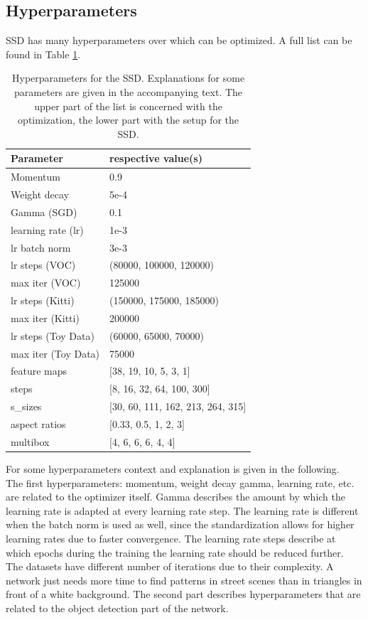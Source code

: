 \subsection{Hyperparameters}
\label{subsec:hyperparameters}

SSD has many hyperparameters over which can be optimized. A full list can be found in Table \ref{table:hyperparameters}.

\begin{table}[!htb]
	\centering
	\caption{Hyperparameters for the SSD. Explanations for some parameters are given in the accompanying text. The upper part of the list is concerned with the optimization, the lower part with the setup for the SSD.}
	\begin{tabularx}{\textwidth}{ X  X}
		\hline
		Parameter & respective value(s) \\
		\hline
		Momentum & 0.9 \\ 
		Weight decay & 5e-4\\
		Gamma (SGD) & 0.1 \\
		learning rate (lr) & 1e-3 \\
		lr batch norm & 3e-3 \\
		lr steps (VOC) & (80000, 100000, 120000) \\
		max iter (VOC) & 125000 \\
		lr steps (Kitti)& (150000, 175000, 185000) \\
		max iter (Kitti) & 200000 \\
		lr steps (Toy Data) & (60000, 65000, 70000) \\
		max iter (Toy Data) & 75000 \\
		\hline
		feature maps & [38, 19, 10, 5, 3, 1] \\
		steps & [8, 16, 32, 64, 100, 300] \\
		s\_sizes & [30, 60, 111, 162, 213, 264, 315] \\
		aspect ratios & [0.33, 0.5, 1, 2, 3] \\
		multibox & [4, 6, 6, 6, 4, 4] \\
		\hline
	\end{tabularx}
	\label{table:hyperparameters}
\end{table}
For some hyperparameters context and explanation is given in the following. \\
The first hyperparameters: momentum, weight decay gamma, learning rate, etc. are related to the optimizer itself. Gamma describes the amount by which the learning rate is adapted at every learning rate step. The learning rate is different when the batch norm is used as well, since the standardization allows for higher learning rates due to faster convergence. The learning rate steps describe at which epochs during the training the learning rate should be reduced further. The datasets have different number of iterations due to their complexity. A network just needs more time to find patterns in street scenes than in triangles in front of a white background. The second part describes hyperparameters that are related to the object detection part of the network. 

